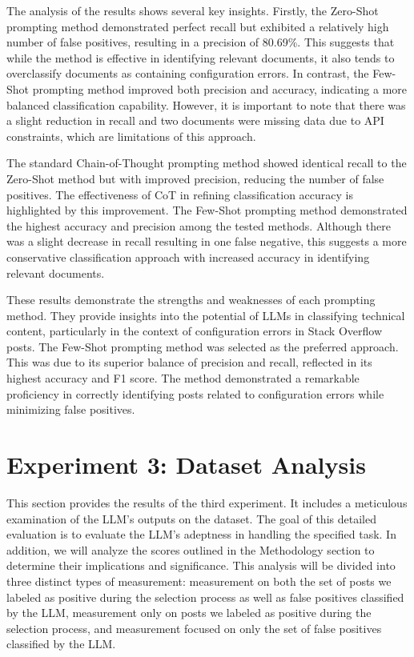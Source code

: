\documentclass[english,bachelor]{swsLeipzig}
\begin{document}
The analysis of the results shows several key insights. Firstly, the Zero-Shot prompting method 
demonstrated perfect recall but exhibited a relatively high number of false positives, resulting in a precision of 80.69\%. This suggests that while the method is effective in identifying relevant documents, it also tends to overclassify documents as containing configuration errors. In contrast, the Few-Shot prompting method improved both precision and accuracy, indicating a more balanced classification capability. However, it is important to note that there was a slight reduction in recall and two documents were missing data due to API constraints, which are limitations of this approach.

The standard Chain-of-Thought prompting method showed identical recall to the Zero-Shot method but with 
improved precision, reducing the number of false positives. The effectiveness of CoT in refining classification accuracy is highlighted by this improvement. The Few-Shot prompting method demonstrated the highest accuracy and precision among the tested methods. Although there was a slight decrease in recall resulting in one false negative, this suggests a more conservative classification approach with increased accuracy in identifying relevant documents.

These results demonstrate the strengths and weaknesses of each prompting method. They provide insights 
into the potential of LLMs in classifying technical content, particularly in the context of configuration errors in Stack Overflow posts. The Few-Shot prompting method was selected as the preferred approach. This was due to its superior balance of precision and recall, reflected in its highest accuracy and F1 score. The method demonstrated a remarkable proficiency in correctly identifying posts related to configuration errors while minimizing false positives.

\section{Experiment 3: Dataset Analysis}

This section provides the results of the third experiment. It 
includes a meticulous examination of the LLM's outputs on the dataset. The goal of this detailed evaluation is to evaluate the LLM's adeptness in handling the specified task. In addition, we will analyze the scores outlined in the Methodology section to determine their implications and significance. This analysis will be divided into three distinct types of measurement: measurement on both the set of posts we labeled as positive during the selection process as well as false positives classified by the LLM, measurement only on posts we labeled as positive during the selection process, and measurement focused on only the set of false positives classified by the LLM.
\end{document}
